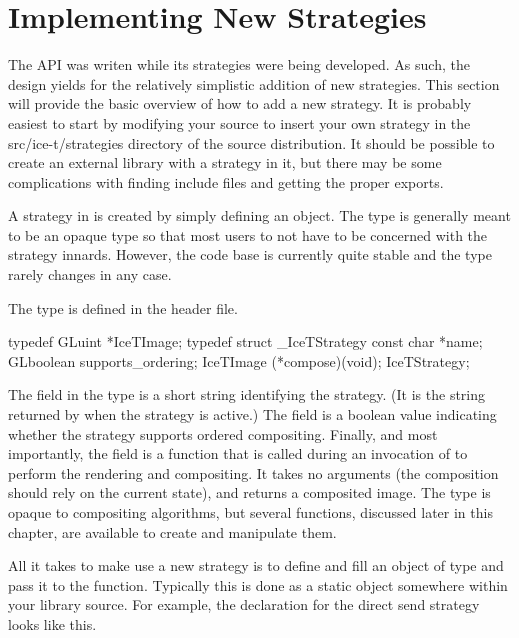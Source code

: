 \section{Implementing New Strategies}

The \IceT API was writen while its strategies were being developed.  As
such, the design yields for the relatively simplistic addition of new
strategies.  This section will provide the basic overview of how to add a
new strategy.  It is probably easiest to start by modifying your \IceT
source to insert your own strategy in the src/ice-t/strategies directory of
the \IceT source distribution.  It should be possible to create an external
library with a strategy in it, but there may be some complications with
finding include files and getting the proper exports.

A strategy in \IceT is created by simply defining an 
object.  The  type is generally meant to be an opaque
type so that most users to not have to be concerned with the strategy
innards.  However, the \IceT code base is currently quite stable and the
 type rarely changes in any case.

The  type is defined in the
 header file.
\begin{code}
typedef GLuint *IceTImage;
typedef struct _IceTStrategy {
    const char *name;
    GLboolean supports_ordering;
    IceTImage (*compose)(void);
} IceTStrategy;
\end{code}
The  field in the  type is a short string
identifying the strategy.  (It is the string returned by
 when the strategy is active.)  The
 field is a boolean value indicating whether the
strategy supports ordered compositing.  Finally, and most importantly, the
 field is a function that is called during an invocation of
 to perform the rendering and compositing.  It takes
no arguments (the composition should rely on the current \IceT state), and
returns a composited image.  The  type is opaque to
compositing algorithms, but several functions, discussed later in this
chapter, are available to create and manipulate them.

All it takes to make \IceT use a new strategy is to define and fill an
object of type  and pass it to the 
function.  Typically this is done as a static object somewhere within your
library source.  For example, the declaration for the direct send strategy
looks like this.

